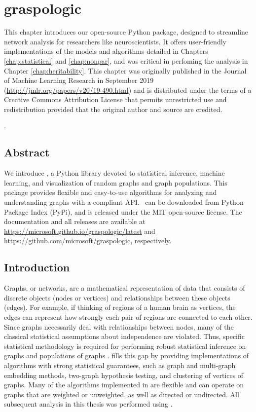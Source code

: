 \chapter{graspologic} \label{chap:graspologic}

This chapter introduces our open-source Python package, designed to streamline network analysis for researchers like neuroscientists. It offers user-friendly implementations of the models and algorithms detailed in Chapters \ref{chap:statistical} and \ref{chap:nonpar}, and was critical in perfoming the analysis in Chapter \ref{chap:heritability}. This chapter was originally published in the Journal of Machine Learning Research in September 2019 (\url{http://jmlr.org/papers/v20/19-490.html}) and is distributed under the terms of a Creative Commons Attribution License that permits unrestricted use and redistribution provided that the original author and source are credited.

\begin{singlespace}         %
    .
\end{singlespace} 

\pagebreak

\section*{Abstract}
We introduce \graspy, a Python library devoted to statistical inference, machine learning, and visualization of random graphs and graph populations. This package  provides flexible and easy-to-use algorithms for analyzing and understanding graphs with a \sklearn compliant API. \graspy ~can be downloaded from Python Package Index (PyPi), and is released under the MIT open-source license. The documentation and all releases are available at \url{https://microsoft.github.io/graspologic/latest} and \url{https://github.com/microsoft/graspologic}, respectively.
\pagebreak


\section{Introduction}
Graphs, or networks, are a mathematical representation of data that consists of discrete objects (nodes or vertices) and relationships between these objects (edges). For example, if thinking of regions of a human brain as vertices, the edges can represent how strongly each pair of regions are connected to each other. 
Since graphs necessarily deal with relationships between nodes, many of the classical statistical assumptions about independence are violated. Thus, specific statistical methodology is required for performing robust statistical inference on graphs and populations of graphs \cite{survey-rdpg}. \graspy fills this gap by providing implementations of algorithms with strong statistical guarantees, such as graph and multi-graph embedding methods, two-graph hypothesis testing, and clustering of vertices of graphs. Many of the algorithms implemented in \graspy are flexible and can operate on graphs that are weighted or unweighted, as well as directed or undirected. All subsequent analysis in this thesis was performed using \graspy.

